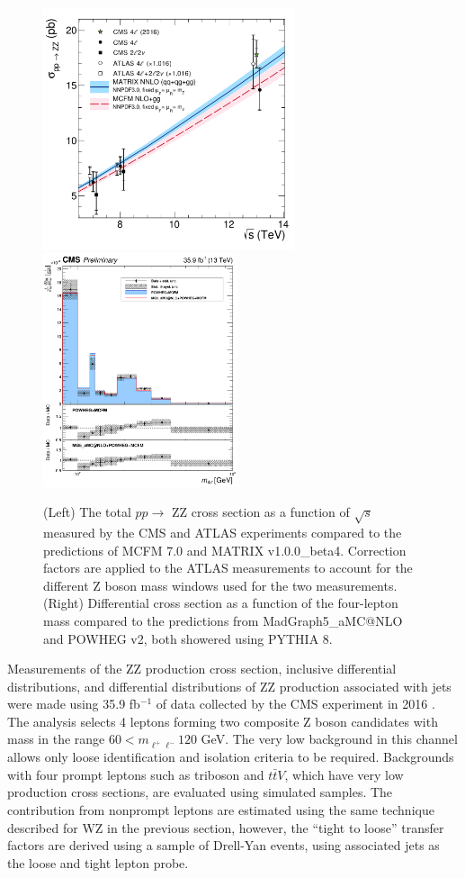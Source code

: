 \documentclass[10pt]{article}
\begin{document}
\begin{figure}[htb]
  \centering
    \includegraphics[height=2.8in]{figures/ZZCrossSection_vs_sqrtS.pdf}
    \includegraphics[height=2.7in]{figures/ZZ_13TeV_mZZ_unfolded.pdf}
    \caption{ (Left) The total $pp \rightarrow$ ZZ cross section
      as a function of $\sqrt{s}$ measured by the CMS and 
      ATLAS experiments compared to the predictions of MCFM 7.0 and MATRIX v1.0.0\_beta4. 
      Correction factors are applied to the ATLAS measurements to account
      for the different Z boson mass windows used for the two measurements.
      (Right) Differential cross section as a function
      of the four-lepton mass compared to the predictions from
      MadGraph5\_aMC@NLO and POWHEG v2, both showered using PYTHIA 8.
      }
  \label{fig:ZZinclusive}
\end{figure}

Measurements of the ZZ production cross section, inclusive differential distributions,
and differential distributions of ZZ production associated with jets
were made using 35.9 fb$^{-1}$ of data collected by the CMS experiment in 2016
\cite{CMS:2017ruh}
\cite{CMS-PAS-SMP-16-019}. The analysis selects 4 leptons forming two composite 
Z boson candidates with
mass in the range $60 < m_{\ell^{+}\ell^{-}} 120$ GeV. The very low background
in this channel allows only loose identification and isolation criteria to 
be required. Backgrounds with four prompt leptons such as triboson and $t\bar{t}V$, 
which have very
low production cross sections, are evaluated using simulated samples. The 
contribution from nonprompt leptons are estimated using the same technique
described for WZ in the previous section, however, the ``tight to loose'' transfer 
factors are derived using a sample of Drell-Yan events, using associated 
jets as the loose and tight lepton probe.
\end{document}
